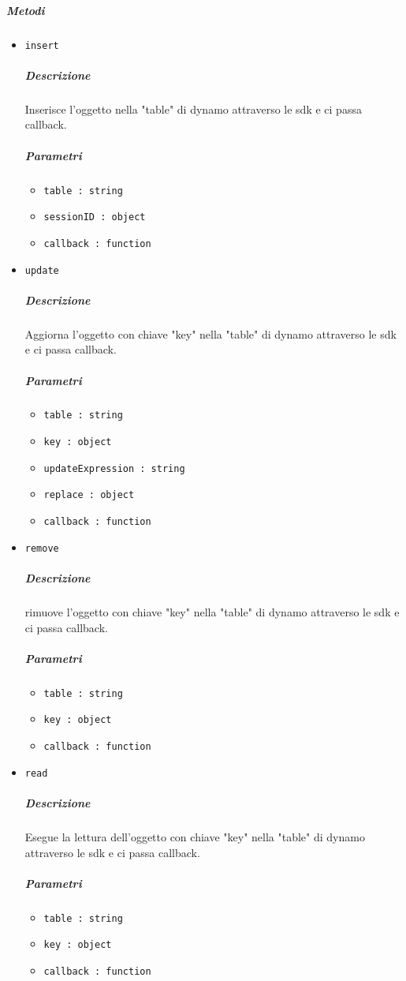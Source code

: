 \documentclass[../ManualeSviluppatore_v1.0.0.tex]{subfiles}
\begin{document}
\subparagraph{Metodi}\begin{itemize}
\item \texttt{insert}
\subparagraph{Descrizione} Inserisce l'oggetto nella "table" di dynamo attraverso le sdk e ci passa callback.
\subparagraph{Parametri}
\begin{itemize}
	\item \texttt{table : string}
	\item \texttt{sessionID : object}
	\item \texttt{callback : function}
\end{itemize}
\item \texttt{update}
\subparagraph{Descrizione} Aggiorna l'oggetto con chiave "key" nella "table" di dynamo attraverso le sdk e ci passa callback.
\subparagraph{Parametri}
\begin{itemize}
	\item \texttt{table : string}
	\item \texttt{key : object}
	\item \texttt{updateExpression : string}
	\item \texttt{replace : object}
	\item \texttt{callback : function}
\end{itemize}

\item \texttt{remove}
\subparagraph{Descrizione} rimuove l'oggetto con chiave "key" nella "table" di dynamo attraverso le sdk e ci passa callback.
\subparagraph{Parametri}
\begin{itemize}
	\item \texttt{table : string}
	\item \texttt{key : object}
	\item \texttt{callback : function}
\end{itemize}

\item \texttt{read}
\subparagraph{Descrizione} Esegue la lettura dell'oggetto con chiave "key" nella "table" di dynamo attraverso le sdk e ci passa callback.
\subparagraph{Parametri}
\begin{itemize}
	\item \texttt{table : string}
	\item \texttt{key : object}
	\item \texttt{callback : function}
\end{itemize}


\end{itemize}
\end{document}
